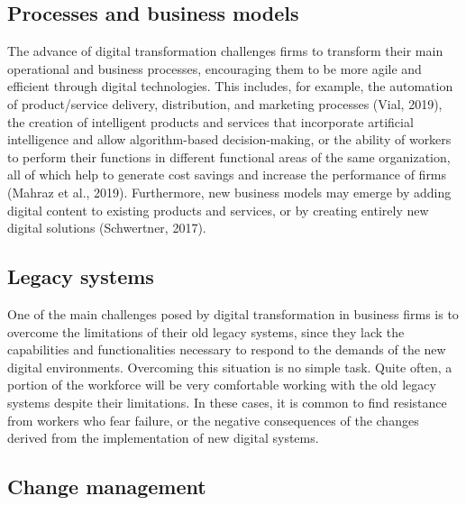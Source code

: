 \documentclass[
  letterpaper,
  DIV=11,
  numbers=noendperiod]{scrreprt}
\begin{document}
\hypertarget{processes-and-business-models}{%
\subsection{Processes and business
models}\label{processes-and-business-models}}

The advance of digital transformation challenges firms to transform
their main operational and business processes, encouraging them to be
more agile and efficient through digital technologies. This includes,
for example, the automation of product/service delivery, distribution,
and marketing processes (Vial, 2019), the creation of intelligent
products and services that incorporate artificial intelligence and allow
algorithm-based decision-making, or the ability of workers to perform
their functions in different functional areas of the same organization,
all of which help to generate cost savings and increase the performance
of firms (Mahraz et al., 2019). Furthermore, new business models may
emerge by adding digital content to existing products and services, or
by creating entirely new digital solutions (Schwertner, 2017).

\hypertarget{legacy-systems}{%
\subsection{Legacy systems}\label{legacy-systems}}

One of the main challenges posed by digital transformation in business
firms is to overcome the limitations of their old legacy systems, since
they lack the capabilities and functionalities necessary to respond to
the demands of the new digital environments. Overcoming this situation
is no simple task. Quite often, a portion of the workforce will be very
comfortable working with the old legacy systems despite their
limitations. In these cases, it is common to find resistance from
workers who fear failure, or the negative consequences of the changes
derived from the implementation of new digital systems.

\hypertarget{change-management}{%
\subsection{Change management}\label{change-management}}
\end{document}

